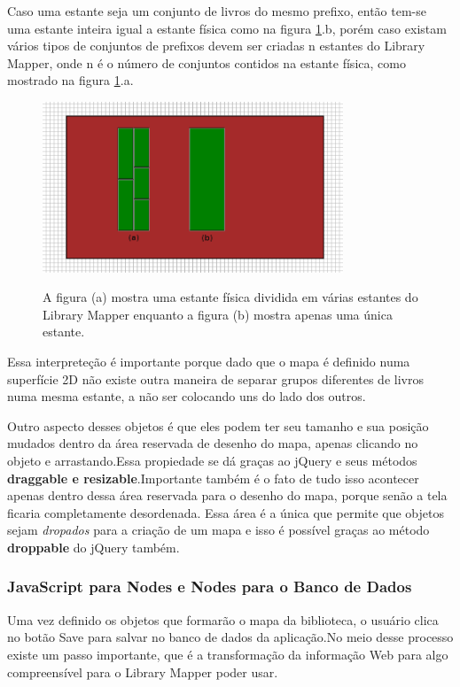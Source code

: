 \documentclass[a4paper,10pt]{article}
\begin{document}
\begin{itemize}
Caso uma estante seja um conjunto de livros do mesmo prefixo, então tem-se uma estante inteira igual a estante física como na figura \ref{variasEstantes}.b, porém caso existam vários tipos de conjuntos de prefixos devem ser criadas n estantes do Library Mapper, onde n é o número de conjuntos contidos na estante física, como mostrado na figura \ref{variasEstantes}.a.
\begin{figure}[H]
	\centering
	\includegraphics[width=0.80\textwidth]{./imgs/estantes.png}\\[1cm]   
	\caption{A figura (a) mostra uma estante física dividida em várias estantes do Library Mapper enquanto a figura (b)
	mostra apenas uma única estante.}
	\label{variasEstantes}
\end{figure}

 	Essa interpreteção é importante porque dado que o mapa é definido numa superfície 2D não existe outra maneira de separar grupos diferentes de livros numa mesma estante, a não ser colocando uns do lado dos outros.
	\end{itemize}
	
	Outro aspecto desses objetos é que eles podem ter seu tamanho e sua posição mudados dentro da área reservada de desenho do mapa, apenas 
	clicando no objeto e arrastando.Essa propiedade se dá graças ao jQuery e seus métodos {\bf draggable e resizable}.Importante também é o
	fato de tudo isso acontecer apenas dentro dessa área reservada para o desenho do mapa, porque senão a tela ficaria completamente desordenada.
	Essa área é a única que permite que objetos sejam {\it dropados} para a criação de um mapa e isso é possível graças ao método {\bf droppable} do jQuery
	também.
	\subsubsection{JavaScript para Nodes e Nodes para o Banco de Dados}
		Uma vez definido os objetos que formarão o mapa da biblioteca, o usuário clica no botão Save para salvar no banco de dados 
	da aplicação.No meio desse processo existe um passo importante, que é a transformação da informação Web para algo compreensível para
	o Library Mapper poder usar.\\
\end{document}
